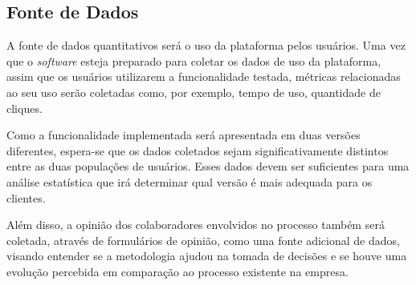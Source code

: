 \subsection{Fonte de Dados}

A fonte de dados quantitativos será o uso da plataforma pelos usuários. Uma vez que o \textit{software} esteja preparado para coletar os dados de uso da plataforma, assim que os usuários utilizarem a funcionalidade testada, métricas relacionadas ao seu uso serão coletadas como, por exemplo, tempo de uso, quantidade de cliques.

Como a funcionalidade implementada será apresentada em duas versões diferentes, espera-se que os dados coletados sejam significativamente distintos entre as duas populações de usuários. Esses dados devem ser suficientes para uma análise estatística que irá determinar qual versão é mais adequada para os clientes.

Além disso, a opinião dos colaboradores envolvidos no processo também será coletada, através de formulários de opinião, como uma fonte adicional de dados, visando entender se a metodologia ajudou na tomada de decisões e se houve uma evolução percebida em comparação ao processo existente na empresa.
